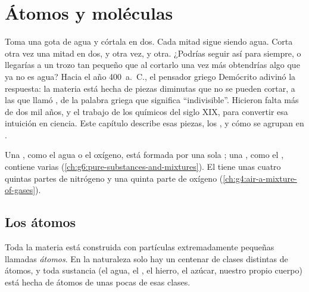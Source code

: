 \chapter{Átomos y moléculas}\label{ch:g7:atoms-and-molecules}

Toma una gota de agua y córtala en dos. Cada mitad sigue siendo agua.
Corta otra vez una mitad en dos, y otra vez, y otra. ¿Podrías seguir
así para siempre, o llegarías a un trozo tan pequeño que al cortarlo una
vez más obtendrías algo que ya no es agua? Hacia el año 400~a.~C., el
pensador griego Demócrito adivinó la respuesta: la materia está hecha de
piezas diminutas que no se pueden cortar, a las que llamó
\emph{}, de la palabra griega que significa ``indivisible''. Hicieron
falta más de dos mil años, y el trabajo de los químicos del siglo XIX,
para convertir esa intuición en ciencia. Este capítulo describe esas
piezas, los , y cómo se agrupan en .

\begin{recall}
Una , como el agua o el oxígeno, está formada por una
sola ; una , como el , contiene varias
(\cref{ch:g6:pure-substances-and-mixtures}). El  tiene unas cuatro
quintas partes de nitrógeno y una quinta parte de oxígeno (\cref{ch:g4:air-a-mixture-of-gases}).
\end{recall}

\section{Los átomos}

\begin{definition}[Átomo]\label{def:g7:atoms-and-molecules:atom}
Toda la materia está construida con partículas extremadamente pequeñas
llamadas
\emph{átomos}. En la naturaleza solo hay un centenar de
clases distintas de átomos, y toda sustancia (el agua, el , el
hierro, el azúcar, nuestro propio cuerpo) está hecha de átomos de unas
pocas de esas clases.
\end{definition}

